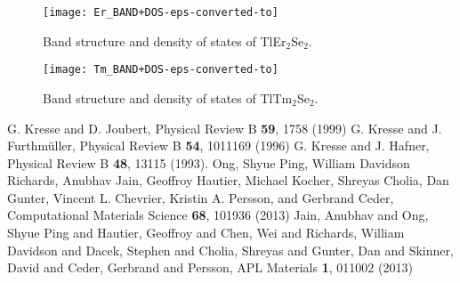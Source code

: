 \documentclass[onecolumn]{revtex4}
\begin{document}
\begin{figure}[ht]
	\centering
\texttt{[image: Er\_BAND+DOS-eps-converted-to]}
	\caption{Band structure and density of states of TlEr$_2$Se$_2$. }
\end{figure}	
\begin{figure}[ht]
	\centering
	\texttt{[image: Tm\_BAND+DOS-eps-converted-to]}
	\caption{Band structure and density of states of TlTm$_2$Se$_2$. }
\end{figure}
%
%

\begin{thebibliography}{99}
 G. Kresse and D. Joubert, Physical Review B \textbf{59}, 1758 (1999)
G. Kresse and J. Furthm\"{u}ller, Physical Review B  \textbf{54}, 1011169 (1996)
G. Kresse and J. Hafner, Physical Review B \textbf{48}, 13115 (1993).
 Ong, Shyue Ping, William Davidson Richards, Anubhav Jain, Geoffroy Hautier, Michael Kocher, Shreyas Cholia, Dan Gunter, Vincent L. Chevrier, Kristin A. Persson, and Gerbrand Ceder, Computational Materials Science \textbf{68}, 101936 (2013)
 Jain, Anubhav and Ong, Shyue Ping and Hautier, Geoffroy and Chen, Wei and Richards, William Davidson and Dacek, Stephen and Cholia, Shreyas and Gunter, Dan and Skinner, David and Ceder, Gerbrand and Persson, APL Materials \textbf{1}, 011002 (2013)
\end{thebibliography}
\end{document}
